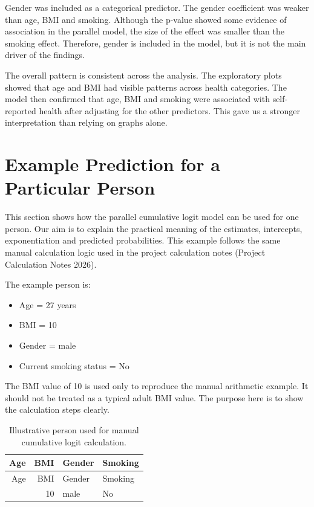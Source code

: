 \documentclass{article}
\providecommand{\tightlist}{%
  \setlength{\itemsep}{0pt}\setlength{\parskip}{0pt}}
\begin{document}
Gender was included as a categorical predictor. The gender coefficient
was weaker than age, BMI and smoking. Although the p-value showed some
evidence of association in the parallel model, the size of the effect
was smaller than the smoking effect. Therefore, gender is included in
the model, but it is not the main driver of the findings.

The overall pattern is consistent across the analysis. The exploratory
plots showed that age and BMI had visible patterns across health
categories. The model then confirmed that age, BMI and smoking were
associated with self-reported health after adjusting for the other
predictors. This gave us a stronger interpretation than relying on
graphs alone.

\section{Example Prediction for a Particular
Person}\label{example-prediction-for-a-particular-person}

This section shows how the parallel cumulative logit model can be used
for one person. Our aim is to explain the practical meaning of the
estimates, intercepts, exponentiation and predicted probabilities. This
example follows the same manual calculation logic used in the project
calculation notes (Project Calculation Notes 2026).

The example person is:

\begin{itemize}
\tightlist
\item
  Age = 27 years
\item
  BMI = 10
\item
  Gender = male
\item
  Current smoking status = No
\end{itemize}

The BMI value of 10 is used only to reproduce the manual arithmetic
example. It should not be treated as a typical adult BMI value. The
purpose here is to show the calculation steps clearly.

\begin{longtable}[]{@{}rrll@{}}
\caption{Illustrative person used for manual cumulative logit
calculation.}\tabularnewline
\toprule\noalign{}
Age & BMI & Gender & Smoking \\
\midrule\noalign{}
\endfirsthead
\toprule\noalign{}
Age & BMI & Gender & Smoking \\
\midrule\noalign{}
\endhead
\bottomrule\noalign{}
\endlastfoot
27 & 10 & male & No \\
\end{longtable}
\end{document}
